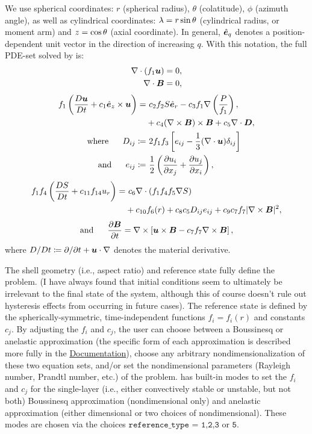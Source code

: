 \documentclass[12pt]{article}
\numberwithin{equation}{section}
\begin{document}
	We use spherical coordinates: $r$ (spherical radius), $\theta$ (colatitude), $\phi$ (azimuth angle), as well as cylindrical coordinates: $\lambda=r\sin\theta$ (cylindrical radius, or moment arm) and $z=\cos\theta$ (axial coordinate). In general, $\hat{\bm{e}}_q$ denotes a position-dependent unit vector in the direction of increasing $q$. With this notation, the full PDE-set solved by {\rayleigh} is:
	\begin{align}
	\nabla\cdot(f_1\bm{u}) &= 0\label{eq:contgen},\\
	\nabla\cdot \bm{B} &= 0,
\end{align}
\begin{subequations}\label{eq:momgen}
	\begin{align}
		f_1\left(\matderiv{\vecu}+c_1\ez\times\vecu\right) =&\ c_2f_2 S\er - c_3 f_1\nabla\left(\frac{P}{f_1} \right), \nonumber\\
		& +c_4(\curl\vecb)\times\vecb+c_5\Div\bm{D},\\
		\where D_{ij} \define&\ 2f_1 f_3 \left[e_{ij} - \frac{1}{3}(\Div\vecu) \delta_{ij} \right]\label{eq:dstressgen}\\
		\andd e_{ij} \define&\ \frac{1}{2}\left(\pderiv{u_i}{x_j} + \pderiv{u_j}{x_i} \right),\label{eq:estressgen}
	\end{align}
\end{subequations}
\begin{align}\label{eq:engen}
	f_1 f_4 \left(\matderiv{S} + c_{11}f_{14} u_r\right) =&\ c_6\Div(f_1 f_4 f_5 \nabla S) \nonumber \\
	&+ c_{10}f_6(r) + c_8 c_5 D_{ij}e_{ij} +c_9c_7f_7|\curl\vecb|^2,
\end{align}
\begin{align}\label{eq:indgen}
	\text{and}\ \ \ \ \  \frac{\partial\bm{B}}{\partial t} = \nabla\times\left[\bm{u}\times\bm{B} - c_7 f_7\nabla\times\bm{B}\right],
\end{align}
where $D/Dt\coloneqq \partial/\partial t+\bm{u}\cdot\nabla$ denotes the material derivative. 

The shell geometry (i.e., aspect ratio) and reference state fully define the problem. (I have always found that initial conditions seem to ultimately be irrelevant to the final state of the system, although this of course doesn't rule out hysteresis effects from occurring in future cases). The reference state is defined by the spherically-symmetric, time-independent functions $f_i=f_i(r)$ and constants $c_j$. By adjusting the $f_i$ and $c_j$, the user can choose between a Boussinesq or anelastic approximation (the specific form of each approximation is described more fully in the  \href{https://rayleigh-documentation.readthedocs.io/en/latest/doc/source/User_Guide/physics_math_overview.html#the-system-of-equations-solved-in-rayleigh}{Documentation}), choose any arbitrary nondimensionalization of these two equation sets, and/or set the nondimensional parameters (Rayleigh number, Prandtl number, etc.) of the problem.  {\rayleigh} has built-in modes to set the $f_i$ and $c_j$ for the single-layer (i.e., either convectively stable or unstable, but not both) Boussinesq approximation (nondimensional only) and anelastic approximation (either dimensional or two choices of nondimensional). These modes are chosen via the choices $\texttt{reference\_type = 1,2,3}$ or $\texttt{5}$. 
\end{document}
